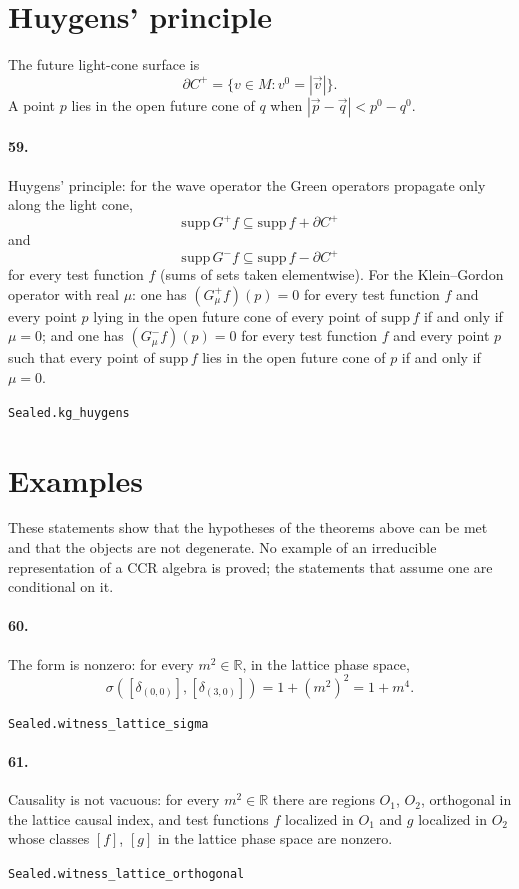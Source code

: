 \documentclass[11pt]{article}
\begin{document}
\section*{Huygens' principle}
The future light-cone surface is \[\partial C^+ = \{v \in M : v^0 = |\vec v|\}.\] A point $p$ lies in the open future cone of $q$ when $|\vec p - \vec q| < p^0 - q^0$.

\paragraph{59.} Huygens' principle: for the wave operator the Green operators propagate only along the light cone, \[\mathrm{supp}\, G^+ f \subseteq \mathrm{supp}\, f + \partial C^+\] and \[\mathrm{supp}\, G^- f \subseteq \mathrm{supp}\, f - \partial C^+\] for every test function $f$ (sums of sets taken elementwise). For the Klein–Gordon operator with real $\mu$: one has $(G_\mu^+ f)(p) = 0$ for every test function $f$ and every point $p$ lying in the open future cone of every point of $\mathrm{supp}\, f$ if and only if $\mu = 0$; and one has $(G_\mu^- f)(p) = 0$ for every test function $f$ and every point $p$ such that every point of $\mathrm{supp}\, f$ lies in the open future cone of $p$ if and only if $\mu = 0$.\par{\footnotesize\texttt{Sealed.kg\_huygens}}

\section*{Examples}
These statements show that the hypotheses of the theorems above can be met and that the objects are not degenerate. No example of an irreducible representation of a CCR algebra is proved; the statements that assume one are conditional on it.

\paragraph{60.} The form is nonzero: for every $m^2 \in \mathbb R$, in the lattice phase space, \[\sigma([\delta_{(0,0)}], [\delta_{(3,0)}]) = 1 + (m^2)^2 = 1 + m^4.\]\par{\footnotesize\texttt{Sealed.witness\_lattice\_sigma}}

\paragraph{61.} Causality is not vacuous: for every $m^2 \in \mathbb R$ there are regions $O_1$, $O_2$, orthogonal in the lattice causal index, and test functions $f$ localized in $O_1$ and $g$ localized in $O_2$ whose classes $[f]$, $[g]$ in the lattice phase space are nonzero.\par{\footnotesize\texttt{Sealed.witness\_lattice\_orthogonal}}
\end{document}
